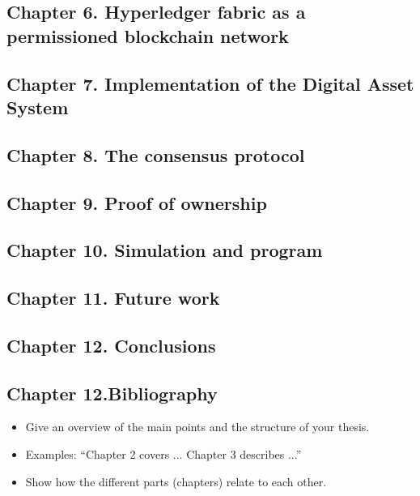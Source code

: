 \subsection{Chapter 6. Hyperledger fabric as a permissioned blockchain network}
\subsection{Chapter 7. Implementation of the Digital Asset System }
\subsection{Chapter 8. The consensus protocol }
\subsection{Chapter 9. Proof of ownership }
\subsection{Chapter 10. Simulation and program }
\subsection{Chapter 11. Future work }
\subsection{Chapter 12. Conclusions }
\subsection{Chapter 12.Bibliography }


\begin{itemize}
\item Give an overview of the main points and the structure of your thesis.
\item Examples: ``Chapter 2 covers ...  Chapter 3 describes ...''
\item Show how the different parts (chapters) relate to each other.
\end{itemize}



